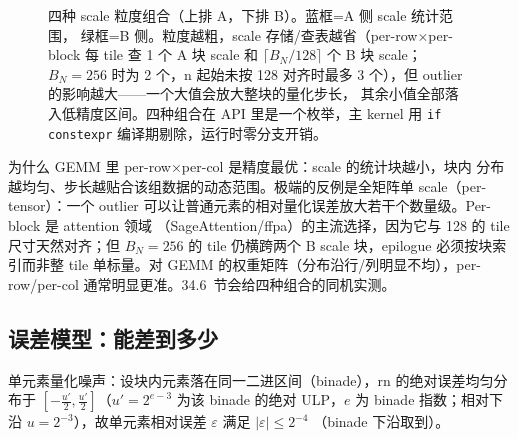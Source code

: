 \begin{figure}[H]
\caption{四种 scale 粒度组合（上排 A，下排 B）。蓝框=A 侧 scale 统计范围，
绿框=B 侧。粒度越粗，scale 存储/查表越省（per-row$\times$per-block 每 tile 查 1 个
A 块 scale 和 $\lceil B_N/128\rceil$ 个 B 块 scale；$B_N=256$ 时为 2 个，n 起始未按 128 对齐时最多 3 个），但 outlier 的影响越大——一个大值会放大整块的量化步长，
其余小值全部落入低精度区间。四种组合在 API 里是一个枚举，主 kernel 用
\texttt{if constexpr} 编译期剔除，运行时零分支开销。}
\label{fig:34-granularity}
\end{figure}

为什么 GEMM 里 per-row$\times$per-col 是精度最优：scale 的统计块越小，块内
分布越均匀、步长越贴合该组数据的动态范围。极端的反例是全矩阵单 scale（per-tensor）：一个 outlier
可以让普通元素的相对量化误差放大若干个数量级。Per-block 是 attention 领域
（SageAttention/ffpa）的主流选择，因为它与 128 的 tile 尺寸天然对齐；但 $B_N=256$
的 tile 仍横跨两个 B scale 块，epilogue 必须按块索引而非整 tile 单标量。对 GEMM 的权重矩阵（分布沿行/列明显不均），per-row/per-col
通常明显更准。34.6~节会给四种组合的同机实测。

\subsection{误差模型：能差到多少}\label{sec:34-err}

单元素量化噪声：设块内元素落在同一二进区间（binade），$\mathrm{rn}$ 的绝对误差均匀分布于
$[-\frac{u'}{2}, \frac{u'}{2}]$（$u' = 2^{e-3}$ 为该 binade 的绝对 ULP，$e$ 为 binade
指数；相对下沿 $u = 2^{-3}$），故单元素相对误差 $\varepsilon$ 满足 $|\varepsilon|\le 2^{-4}$
（binade 下沿取到）。

